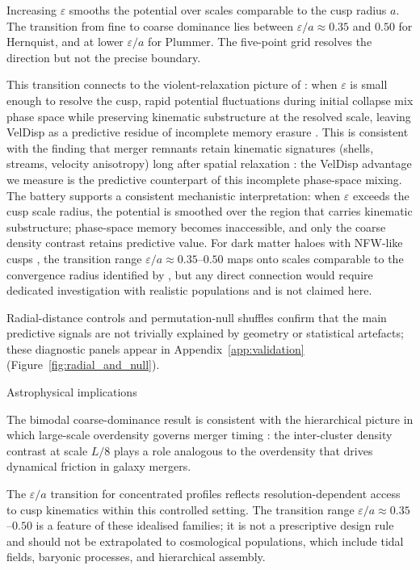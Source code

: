 \documentclass[twocolumn,linenumbers]{aastex701}
\makeatletter
\def\subsection{\@startsection{subsection}{2}{\z@}{9pt plus 1pt minus 1pt}{4pt}%
  {\normalsize\bfseries\center}}
\newcommand{\heps}{\varepsilon}
\makeatother
\begin{document}
Increasing $\heps$ smooths the potential over scales comparable to the
cusp radius $a$.  The transition from fine to coarse dominance lies
between $\heps/a \approx 0.35$ and $0.50$ for Hernquist, and at lower
$\heps/a$ for Plummer.  The five-point grid resolves the direction but
not the precise boundary.

This transition connects to the violent-relaxation picture of
\citet{LyndenBell1967}: when $\heps$ is small enough to resolve the cusp,
rapid potential fluctuations during initial collapse mix phase space while
preserving kinematic substructure at the resolved scale, leaving VelDisp
as a predictive residue of incomplete memory erasure \citep{Chavanis2002}.
This is consistent with the finding that merger remnants retain kinematic
signatures (shells, streams, velocity anisotropy) long after spatial
relaxation \citep{HernquistSpergel1992}: the VelDisp advantage we
measure is the predictive counterpart of this incomplete phase-space mixing.
The battery supports a consistent mechanistic interpretation: when
$\heps$ exceeds the cusp scale radius, the potential is smoothed over the
region that carries kinematic substructure; phase-space memory becomes
inaccessible, and only the coarse density contrast retains predictive
value.
For dark matter haloes with NFW-like cusps \citep{NFW1996,NFW1997},
the transition range $\heps/a \approx 0.35$--$0.50$ maps onto scales
comparable to the convergence radius identified by \citet{PowerEtal2003},
but any direct connection would require dedicated investigation with
realistic populations and is not claimed here.

Radial-distance controls and permutation-null shuffles confirm that the
main predictive signals are not trivially explained by geometry or
statistical artefacts; these diagnostic panels appear in
Appendix~\ref{app:validation} (Figure~\ref{fig:radial_and_null}).

\subsection{Astrophysical implications}

The bimodal coarse-dominance result is consistent with the hierarchical
picture in which large-scale overdensity governs merger timing
\citep{White1996}: the inter-cluster density contrast at scale $L/8$
plays a role analogous to the overdensity that drives dynamical friction
in galaxy mergers.

The $\heps/a$ transition for concentrated profiles reflects
resolution-dependent access to cusp kinematics within this controlled
setting.
The transition range $\heps/a \approx 0.35$--$0.50$ is a feature of these
idealised families; it is not a prescriptive design rule and should not
be extrapolated to cosmological populations, which include tidal fields,
baryonic processes, and hierarchical assembly.
\end{document}
